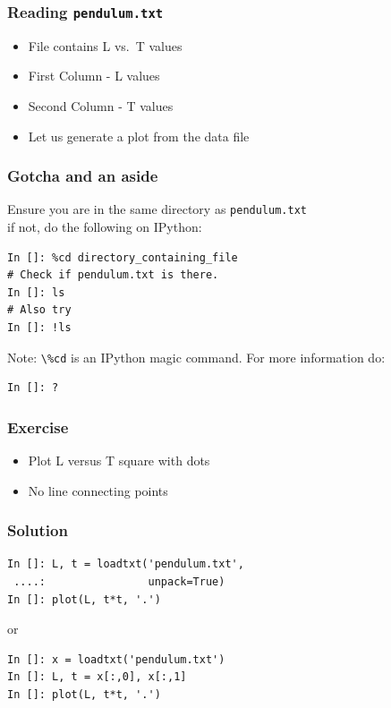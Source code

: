 \documentclass[14pt,compress]{beamer}
\newcommand{\typ}[1]{\lstinline{#1}}
\begin{document}
\begin{frame}[fragile]
\frametitle{Reading \typ{pendulum.txt}}
\begin{itemize}
  \item File contains L vs.\ T values 
  \item First Column - L values
  \item Second Column - T values
  \item Let us generate a plot from the data file
\end{itemize}
\end{frame}

\begin{frame}[fragile]
    \frametitle{Gotcha and an aside}
    Ensure you are in the same directory as \typ{pendulum.txt}\\
    if not, do the following on IPython:
    \begin{lstlisting}
In []: %cd directory_containing_file
# Check if pendulum.txt is there.
In []: ls
# Also try 
In []: !ls
    \end{lstlisting}

    \alert{Note:} \typ{\%cd} is an IPython magic command.  For more information
    do:
    \begin{lstlisting}
In []: ?
    \end{lstlisting}
\end{frame}


\begin{frame}[fragile]
    \frametitle{Exercise}
    \begin{itemize}
        \item Plot L versus T square with dots
        \item No line connecting points
    \end{itemize}
\end{frame}

\begin{frame}[fragile]
\frametitle{Solution}
\begin{lstlisting}
In []: L, t = loadtxt('pendulum.txt', 
 ....:                unpack=True)
In []: plot(L, t*t, '.')
\end{lstlisting}
or
\begin{lstlisting}
In []: x = loadtxt('pendulum.txt')
In []: L, t = x[:,0], x[:,1]
In []: plot(L, t*t, '.')
\end{lstlisting}

\end{frame}
\end{document}
